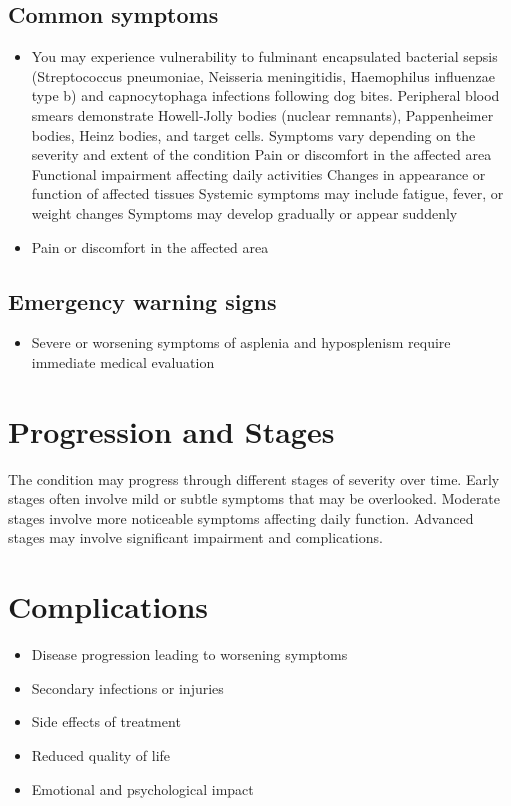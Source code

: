\subsection{Common symptoms}
\begin{itemize}[noitemsep]
  \item You may experience vulnerability to fulminant encapsulated bacterial sepsis (Streptococcus pneumoniae, Neisseria meningitidis, Haemophilus influenzae type b) and capnocytophaga infections following dog bites. Peripheral blood smears demonstrate Howell-Jolly bodies (nuclear remnants), Pappenheimer bodies, Heinz bodies, and target cells. Symptoms vary depending on the severity and extent of the condition Pain or discomfort in the affected area Functional impairment affecting daily activities Changes in appearance or function of affected tissues Systemic symptoms may include fatigue, fever, or weight changes Symptoms may develop gradually or appear suddenly
  \item Pain or discomfort in the affected area
  \end{itemize}

\subsection{Emergency warning signs}
\begin{itemize}[noitemsep]
  \item Severe or worsening symptoms of asplenia and hyposplenism require immediate medical evaluation
\end{itemize}
\section{Progression and Stages}
The condition may progress through different stages of severity over time. Early stages often involve mild or subtle symptoms that may be overlooked. Moderate stages involve more noticeable symptoms affecting daily function. Advanced stages may involve significant impairment and complications.
\section{Complications}
\begin{itemize}[noitemsep]
  \item Disease progression leading to worsening symptoms
  \item Secondary infections or injuries
  \item Side effects of treatment
  \item Reduced quality of life
  \item Emotional and psychological impact
\end{itemize}

